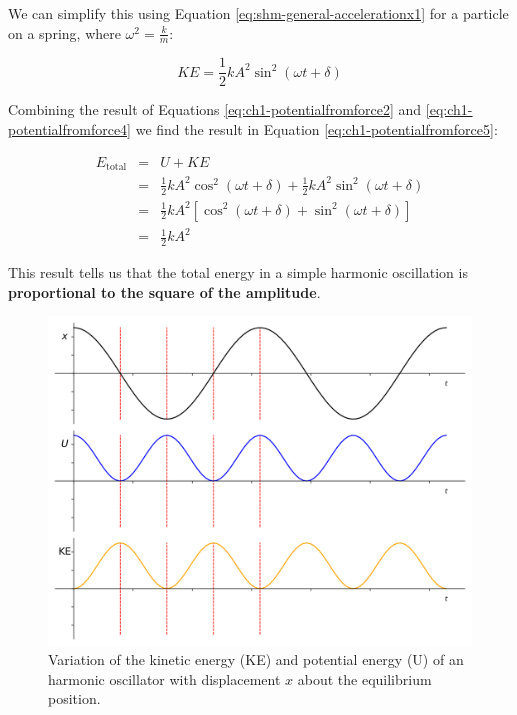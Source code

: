 \documentclass[
]{book}
\begin{document}
We can simplify this using Equation \eqref{eq:shm-general-accelerationx1} for a particle on a spring, where \(\omega^2 = \frac{k}{m}\):

\begin{equation}
KE = \frac{1}{2}kA^2 \sin^2 (\omega t + \delta)
\label{eq:ch1-potentialfromforce4}
\end{equation}

Combining the result of Equations \eqref{eq:ch1-potentialfromforce2} and \eqref{eq:ch1-potentialfromforce4} we find the result in Equation \eqref{eq:ch1-potentialfromforce5}:

\begin{equation}
\begin{array}{rcl}
E_\textrm{total} &=& U + KE \\
& =& \frac{1}{2}kA^2 \cos^2 (\omega t + \delta) + \frac{1}{2}kA^2 \sin^2 (\omega t + \delta)\\
& =& \frac{1}{2}kA^2 \left[ \cos^2 (\omega t + \delta) + \sin^2 (\omega t + \delta)\right]\\
&=& \frac{1}{2}kA^2
\end{array}
\label{eq:ch1-potentialfromforce5}
\end{equation}

This result tells us that the total energy in a simple harmonic oscillation is \textbf{proportional to the square of the amplitude}.

\begin{figure}

{\centering \includegraphics[width=0.7\linewidth]{visualisations/ch1-shmenergy} 

}

\caption{Variation of the kinetic energy (KE) and potential energy (U) of an harmonic oscillator with displacement $x$ about the equilibrium position. }\label{fig:ch1-energyinshm}
\end{figure}
\end{document}
